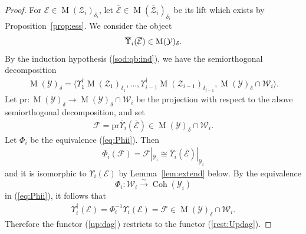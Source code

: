 \documentclass [11pt,oneside,a4paper,mathscr]{amsart}
\theoremstyle{definition}
\newcommand{\Y}{\mathcal{Y}}
\newcommand{\MM}{\operatorname{M}}
\newcommand{\Coh}{\operatorname{Coh}}
\begin{document}
\begin{proof}
For $\mathcal{E} \in \MM(\mathcal{Z}_i)_{\delta_i}$, let $\overline{\mathcal{E}} \in \MM(\overline{\mathcal{Z}}_i)_{\delta_i}$ be its lift 
which exists by Proposition~\ref{prop:ess}.
We consider the object 
\begin{align}\notag
\overline{\Upsilon}_i(\overline{\mathcal{E}}) \in \MM(\mathcal{Y})_{\delta}.
\end{align}
By the induction hypothesis (\ref{sod:qb:ind}), we have the semiorthogonal decomposition 
\begin{align}\label{ind:tr}
    \MM(\mathcal{Y})_{\delta}=\langle \Upsilon_1^{\dag}\MM(\mathcal{Z}_1)_{\delta_1}, \ldots, 
    \Upsilon_{i-1}^{\dag} \MM(\mathcal{Z}_{i-1})_{\delta_{i-1}}, \MM(\mathcal{Y})_{\delta} \cap \mathcal{W}_i
    \rangle. 
\end{align}
Let $\mathrm{pr} \colon \MM(\mathcal{Y})_{\delta} \to \MM(\mathcal{Y})_{\delta} \cap \mathcal{W}_i$
be the projection with respect to the above semiorthogonal decomposition, and set 
\begin{align*}
    \mathcal{F}=\mathrm{pr}\overline{\Upsilon}_i(\overline{\mathcal{E}}) \in 
    \MM(\mathcal{Y})_{\delta} \cap \mathcal{W}_i. 
\end{align*}
Let $\Phi_i$ be the equivalence (\ref{eq:Phii}). 
Then 
\begin{align*}
\Phi_i(\mathcal{F})=\mathcal{F}|_{\Y_i} \cong\overline{\Upsilon}_i(\overline{\mathcal{E}})|_{\mathcal{Y}_i}
\end{align*}
and it is isomorphic to 
$\Upsilon_i(\mathcal{E})$ by Lemma~\ref{lem:extend} below. 
By the equivalence \[\Phi_i \colon \mathcal{W}_i \stackrel{\sim}{\to} \Coh(\mathcal{Y}_i)\] in 
(\ref{eq:Phii}),
it follows that 
\begin{align*}
    \Upsilon_i^{\dag}(\mathcal{E})=\Phi_i^{-1}\Upsilon_i(\mathcal{E})=\mathcal{F}
    \in \MM(\mathcal{Y})_{\delta} \cap \mathcal{W}_i. 
\end{align*}
Therefore the functor (\ref{up:dag}) restricts to the functor (\ref{rest:Updag}). 


\end{proof}
\end{document}
